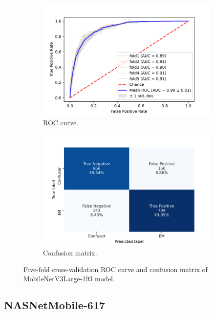 \begin{figure}[h!]
	\centering
	\begin{subfigure}[b]{0.49\textwidth}
		\centering
		\includegraphics[width=\textwidth,keepaspectratio]{images/Supplement4/image157.png}
		\caption{ROC curve.}
	\end{subfigure}
	\hfill
	\begin{subfigure}[b]{0.49\textwidth}
		\centering
		\includegraphics[width=\textwidth,keepaspectratio]{images/Supplement4/image162.png}
		\caption{Confusion matrix.}
	\end{subfigure}
	\caption{Five-fold cross-validation ROC curve and confusion matrix of MobileNetV3Large-193 model.}
\end{figure}

\vfill\clearpage
\subsection{NASNetMobile-617}

